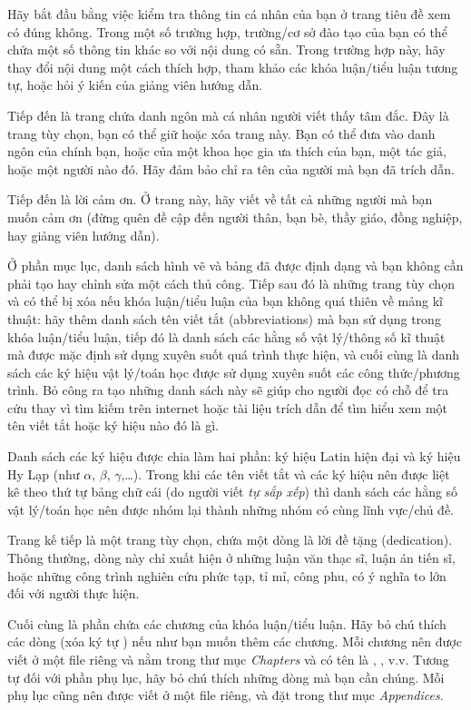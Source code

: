 Hãy bắt đầu bằng việc kiểm tra thông tin cá nhân của bạn ở trang tiêu đề xem có đúng không. Trong một số trường hợp, trường/cơ sở đào tạo của bạn có thể chứa một số thông tin khác so với nội dung có sẵn. Trong trường hợp này, hãy thay đổi nội dung một cách thích hợp, tham khảo các khóa luận/tiểu luận tương tự, hoặc hỏi ý kiến của giảng viên hướng dẫn.

Tiếp đến là trang chứa danh ngôn mà cá nhân người viết thấy tâm đắc. Đây là trang tùy chọn, bạn có thể giữ hoặc xóa trang này. Bạn có thể đưa vào danh ngôn của chính bạn, hoặc của một khoa học gia ưa thích của bạn, một tác giả, hoặc một người nào đó. Hãy đảm bảo chỉ ra tên của người mà bạn đã trích dẫn.

Tiếp đến là lời cảm ơn. Ở trang này, hãy viết về tất cả những người mà bạn muốn cảm ơn (đừng quên đề cập đến người thân, bạn bè, thầy giáo, đồng nghiệp, hay giảng viên hướng dẫn).

Ở phần mục lục, danh sách hình vẽ và bảng đã được định dạng và bạn không cần phải tạo hay chỉnh sửa một cách thủ công. Tiếp sau đó là những trang tùy chọn và có thể bị xóa nếu khóa luận/tiểu luận của bạn không quá thiên về mảng kĩ thuật: hãy thêm danh sách tên viết tắt (abbreviations) mà bạn sử dụng trong khóa luận/tiểu luận, tiếp đó là danh sách các hằng số vật lý/thông số kĩ thuật mà được mặc định sử dụng xuyên suốt quá trình thực hiện, và cuối cùng là danh sách các ký hiệu vật lý/toán học được sử dụng xuyên suốt các công thức/phương trình. Bỏ công ra tạo những danh sách này sẽ giúp cho người đọc có chỗ để tra cứu thay vì tìm kiếm trên internet hoặc tài liệu trích dẫn để tìm hiểu xem một tên viết tắt hoặc ký hiệu nào đó là gì.

Danh sách các ký hiệu được chia làm hai phần: ký hiệu Latin hiện đại và ký hiệu Hy Lạp (như $\alpha$, $\beta$, $\gamma$,\ldots). Trong khi các tên viết tắt và các ký hiệu nên được liệt kê theo thứ tự bảng chữ cái (do người viết \emph{tự sắp xếp}) thì danh sách các hằng số vật lý/toán học nên được nhóm lại thành những nhóm có cùng lĩnh vực/chủ đề.

Trang kế tiếp là một trang tùy chọn, chứa một dòng là lời đề tặng (dedication). Thông thường, dòng này chỉ xuất hiện ở những luận văn thạc sĩ, luận án tiến sĩ, hoặc những công trình nghiên cứu phức tạp, tỉ mỉ, công phu, có ý nghĩa to lớn đối với người thực hiện.

Cuối cùng là phần chứa các chương của khóa luận/tiểu luận. Hãy bỏ chú thích các dòng (xóa ký tự \code{\%}) nếu như bạn muốn thêm các chương. Mỗi chương nên được viết ở một file riêng và nằm trong thư mục \emph{Chapters} và có tên là , , v.v. Tương tự đối với phần phụ lục, hãy bỏ chú thích những dòng mà bạn cần chúng. Mỗi phụ lục cũng nên được viết ở một file riêng, và đặt trong thư mục \emph{Appendices}.

